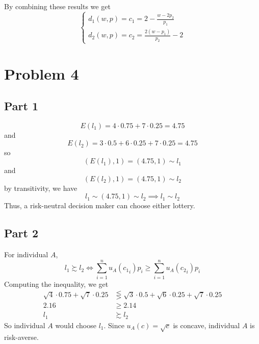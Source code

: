 \documentclass[12pt]{extarticle}
\numberwithin{table}{section}
\numberwithin{figure}{section}
\numberwithin{equation}{section}
\begin{document}
By combining these results we get
\begin{equation}
    \begin{cases}
        d_1(w, p) = c_1 = 2 - \frac{w - 2p_2}{p_1} \\
        d_2(w, p) = c_2 = \frac{2(w - p_1)}{p_2} - 2
    \end{cases}
\end{equation}

\section*{Problem 4}

\subsection*{Part 1}
\begin{equation}
    E(l_1) = 4 \cdot 0.75 + 7 \cdot 0.25 = 4.75
\end{equation}
and
\begin{equation}
    E(l_2) = 3 \cdot 0.5 + 6 \cdot 0.25 + 7 \cdot 0.25 = 4.75
\end{equation}
so
\begin{equation}
    (E(l_1), 1) = (4.75, 1) \sim l_1
\end{equation}
and
\begin{equation}
    (E(l_2), 1) = (4.75, 1) \sim l_2
\end{equation}
by transitivity, we have
\begin{equation}
    l_1 \sim (4.75, 1) \sim l_2 \implies l_1 \sim l_2
\end{equation}
Thus, a risk-neutral decision maker can choose either lottery.

\subsection*{Part 2}
For individual $A$,
\begin{equation}
    l_1 \succsim l_2 \iff \sum_{i = 1}^n u_A({c_1}_i) p_i \ge \sum_{i = 1}^n u_A({c_2}_i) p_i
\end{equation}
Computing the inequality, we get
\begin{align}
    \sqrt{4} \cdot 0.75 + \sqrt7 \cdot 0.25 & \lesseqgtr \sqrt3 \cdot 0.5 + \sqrt6 \cdot 0.25 + \sqrt7 \cdot 0.25 \\
    2.16                                    & \ge 2.14                                                            \\
    l_1                                     & \succsim l_2
\end{align}
So individual $A$ would choose $l_1$. Since $u_A(c) = \sqrt c$ is concave, individual $A$ is risk-averse.
\end{document}
